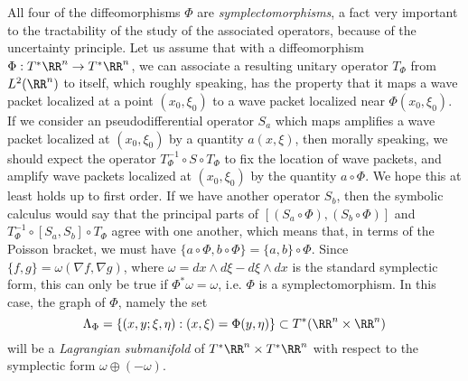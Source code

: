 All four of the diffeomorphisms $\Phi$ are \emph{symplectomorphisms}, a fact very important to the tractability of the study of the associated operators, because of the uncertainty principle. Let us assume that with a diffeomorphism $\Phi: T^* \RR^n \to T^* \RR^n$, we can associate a resulting unitary operator $T_\Phi$ from $L^2(\RR^n)$ to itself, which roughly speaking, has the property that it maps a wave packet localized at a point $(x_0,\xi_0)$ to a wave packet localized near $\Phi(x_0,\xi_0)$. If we consider an pseudodifferential operator $S_a$ which maps amplifies a wave packet localized at $(x_0,\xi_0)$ by a quantity $a(x,\xi)$, then morally speaking, we should expect the operator $T_\Phi^{-1} \circ S \circ T_\Phi$ to fix the location of wave packets, and amplify wave packets localized at $(x_0,\xi_0)$ by the quantity $a \circ \Phi$. We hope this at least holds up to first order. If we have another operator $S_b$, then the symbolic calculus would say that the principal parts of  $[(S_a \circ \Phi), (S_b \circ \Phi)]$ and $T_\Phi^{-1} \circ [S_a, S_b] \circ T_\Phi$ agree with one another, which means that, in terms of the Poisson bracket, we must have $\{ a \circ \Phi, b \circ \Phi \} = \{ a, b \} \circ \Phi$. Since $\{ f,g \} = \omega( \nabla f, \nabla g )$, where $\omega = dx \wedge d\xi - d\xi \wedge dx$ is the standard symplectic form, this can only be true if $\Phi^* \omega = \omega$, i.e. $\Phi$ is a symplectomorphism. In this case, the graph of $\Phi$, namely the set
%
\[ \Lambda_\Phi = \{ (x,y;\xi,\eta) : (x,\xi) = \Phi(y,\eta) \} \subset T^*(\RR^n \times \RR^n) \]
%
will be a \emph{Lagrangian submanifold} of $T^* \RR^n \times T^* \RR^n$ with respect to the symplectic form $\omega \oplus (- \omega)$.
%

